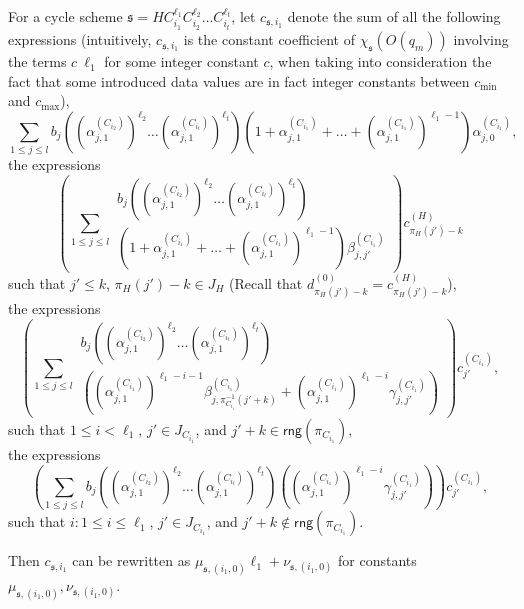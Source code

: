\documentclass[runningheads,a4paper]{llncs}
\def\schm{{\mathfrak{s} }}
\newcommand\rng{\mathsf{rng}}
\begin{document}
\begin{appendix}
For a cycle scheme $\schm=HC_{i_1}^{\ell_1} C_{i_2}^{\ell_2} \dots C_{i_t}^{\ell_t}$, let $c_{\schm,i_1}$ denote the sum of all the following expressions (intuitively, $c_{\schm,i_1}$ is the constant coefficient of $\chi_\schm(O(q_m))$ involving the terms $ c\ \ell_1$ for some integer constant $c$, when taking into consideration the fact that some introduced data values are in fact integer constants between $c_{\min}$ and $c_{\max}$),
\[
\sum \limits_{1 \le j \le l} 
b_j \left((\alpha^{(C_{i_2})}_{j,1})^{\ell_2} \dots (\alpha^{(C_{i_t})}_{j,1})^{\ell_t}\right) 
\left(1+\alpha^{(C_{i_1})}_{j,1} + \dots + (\alpha^{(C_{i_1})}_{j,1})^{\ell_1-1} \right) \alpha^{(C_{i_1})}_{j,0},
\]
the expressions 
\[
\left(\sum \limits_{1 \le j \le l} 
\begin{array}{l}
b_j \left((\alpha^{(C_{i_2})}_{j,1})^{\ell_2} \dots (\alpha^{(C_{i_t})}_{j,1})^{\ell_t}\right) \\
\left(1+\alpha^{(C_{i_1})}_{j,1} + \dots + (\alpha^{(C_{i_1})}_{j,1})^{\ell_1-1} \right) \beta^{(C_{i_1})}_{j,j'}
\end{array}
\right) c^{(H)}_{\pi_H(j')-k}
\]
such that $j' \le k$, $\pi_H(j')-k \in J_H$ (Recall that $d^{(0)}_{\pi_H(j')-k}=c^{(H)}_{\pi_H(j')-k}$), \\
the expressions
\[
\left(\sum \limits_{1 \le j \le l} 
\begin{array}{l}
b_j \left((\alpha^{(C_{i_2})}_{j,1})^{\ell_2} \dots (\alpha^{(C_{i_t})}_{j,1})^{\ell_t}\right) \\
\left((\alpha^{(C_{i_1})}_{j,1})^{\ell_1-i-1} \beta^{(C_{i_1})}_{j,\pi^{-1}_{C_{i_1}}(j'+k)} + (\alpha^{(C_{i_1})}_{j,1})^{\ell_1-i} \gamma^{(C_{i_1})}_{j,j'}\right)
\end{array}
\right) c^{(C_{i_1})}_{j'},
\]
such that $1 \le i < \ell_1$, $j' \in J_{C_{i_1}}$, and $j'+k \in \rng(\pi_{C_{i_1}})$,\\
the expressions
\[
\left(\sum \limits_{1 \le j \le l} 
b_j \left((\alpha^{(C_{i_2})}_{j,1})^{\ell_2} \dots (\alpha^{(C_{i_t})}_{j,1})^{\ell_t}\right)  \left( (\alpha^{(C_{i_1})}_{j,1})^{\ell_1-i} \gamma^{(C_{i_1})}_{j,j'}\right)
\right) c^{(C_{i_1})}_{j'},
\]
such that $i: 1 \le i \le \ell_1$, $j' \in J_{C_{i_1}}$, and $j'+k \not \in \rng(\pi_{C_{i_1}})$.

Then $c_{\schm,i_1}$ can be rewritten as $\mu_{\schm, (i_1,0)} \ell_1 + \nu_{\schm, (i_1,0)}$ for constants $\mu_{\schm, (i_1,0)},\nu_{\schm, (i_1,0)}$.


\end{appendix}
\end{document}
